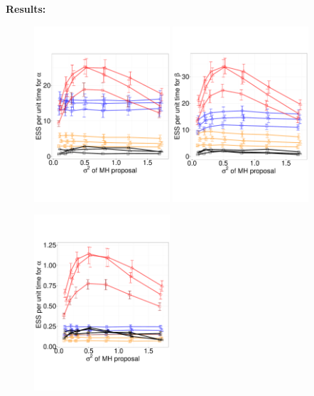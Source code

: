 \noindent \textbf{Results:}
  \begin{figure}%
  \centering
  \begin{minipage}[!hp]{0.95\linewidth}
  \centering
    \includegraphics [width=0.45\textwidth, angle=0]{figs/exp_3_alpha.pdf}
    \includegraphics [width=0.45\textwidth, angle=0]{figs/exp_3_beta.pdf}
  \vspace{-1in}
  \end{minipage}
  \begin{minipage}[!hp]{0.95\linewidth}
  \centering
    \includegraphics [width=0.45\textwidth, angle=0]{figs/exp_10_alpha.pdf}

\end{minipage}
\end{figure}
